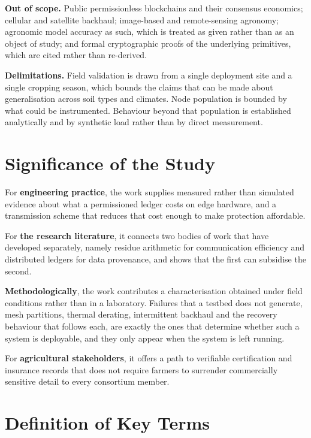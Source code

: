 \documentclass[12pt,a4paper,oneside]{book}
\begin{document}
\textbf{Out of scope.} Public permissionless blockchains and their consensus
economics; cellular and satellite backhaul; image-based and remote-sensing
agronomy; agronomic model accuracy as such, which is treated as given rather
than as an object of study; and formal cryptographic proofs of the underlying
primitives, which are cited rather than re-derived.

\textbf{Delimitations.} Field validation is drawn from a single deployment site
and a single cropping season, which bounds the claims that can be made about
generalisation across soil types and climates. Node population is bounded by
what could be instrumented. Behaviour beyond that population is established
analytically and by synthetic load rather than by direct measurement.

\section{Significance of the Study}
\label{sec:significance}

For \textbf{engineering practice}, the work supplies measured rather than
simulated evidence about what a permissioned ledger costs on edge hardware, and
a transmission scheme that reduces that cost enough to make protection
affordable.

For \textbf{the research literature}, it connects two bodies of work that have
developed separately, namely residue arithmetic for communication efficiency and
distributed ledgers for data provenance, and shows that the first can subsidise
the second.

\textbf{Methodologically}, the work contributes a characterisation obtained under
field conditions rather than in a laboratory. Failures that a testbed does not
generate, mesh partitions, thermal derating, intermittent backhaul and the
recovery behaviour that follows each, are exactly the ones that determine
whether such a system is deployable, and they only appear when the system is
left running.

For \textbf{agricultural stakeholders}, it offers a path to verifiable
certification and insurance records that does not require farmers to surrender
commercially sensitive detail to every consortium member.

\section{Definition of Key Terms}
\label{sec:definitions}
\end{document}
